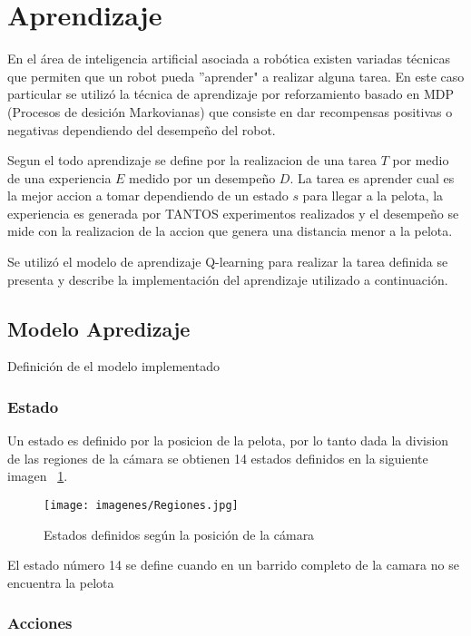 
\section{Aprendizaje}
 
En el área de inteligencia artificial asociada a robótica existen variadas técnicas que permiten que un robot pueda ''aprender" a realizar alguna tarea. En este caso particular se utiliz\'o la técnica de aprendizaje por reforzamiento basado en MDP (Procesos de desici\'on Markovianas) que consiste en dar recompensas positivas o negativas dependiendo del desempeño del robot.


Segun el \cite{Mitchell} todo aprendizaje se define por la realizacion de una tarea $T$ por medio de una experiencia $E$ medido por un desempeño $D$. La tarea es aprender cual es la mejor accion a tomar dependiendo de un estado $s$ para llegar a la pelota, la experiencia es generada por TANTOS experimentos realizados y el desempeño se mide con la realizacion de la accion que genera una distancia menor a la pelota.

Se utilizó el modelo de aprendizaje Q-learning para realizar la tarea definida se presenta y describe la implementación del aprendizaje utilizado a continuación.

\subsection{Modelo Apredizaje}

Definici\'on de el modelo implementado

\subsubsection{Estado}

Un estado es definido por la posicion de la pelota, por lo tanto dada la division de las regiones de la c\'amara  se  obtienen 14 estados definidos en la siguiente imagen ~\ref{fig:estados}.

\begin{figure}[hbtp]
\centering
\texttt{[image: imagenes/Regiones.jpg]}
\caption{Estados definidos seg\'un la posici\'on de la c\'amara}
\label{fig:estados}
\end{figure}

El estado n\'umero 14 se define cuando en un barrido completo de la camara no se encuentra la pelota

\subsubsection{Acciones}

